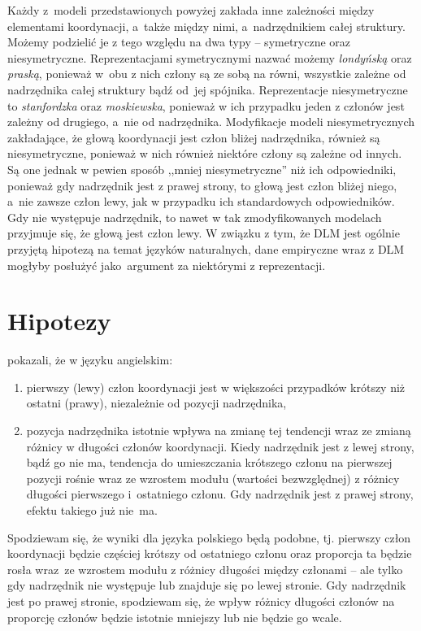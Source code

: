 \documentclass[licencjacka]{pracamgr_Kogni}
\begin{document}
    Każdy z~modeli przedstawionych powyżej zakłada inne zależności między elementami koordynacji, a~także między nimi, a~nadrzędnikiem całej struktury.
    Możemy podzielić je z tego względu na dwa typy -- symetryczne oraz niesymetryczne.
    Reprezentacjami symetrycznymi nazwać możemy \textit{londyńską} oraz \textit{praską}, ponieważ w~obu z nich człony są ze sobą na równi, wszystkie zależne od nadrzędnika całej struktury bądź od~jej spójnika.
    Reprezentacje niesymetryczne to \textit{stanfordzka} oraz \textit{moskiewska}, ponieważ w ich przypadku jeden z członów jest zależny od drugiego, a~nie od nadrzędnika.
    Modyfikacje modeli niesymetrycznych zakładające, że głową koordynacji jest człon bliżej nadrzędnika, również są niesymetryczne, ponieważ w nich również niektóre człony są zależne od innych. 
    Są one jednak w pewien sposób ,,mniej  niesymetryczne'' niż ich odpowiedniki, ponieważ gdy nadrzędnik jest z prawej strony, to głową jest człon bliżej niego, a~nie zawsze człon lewy, jak w przypadku ich standardowych odpowiedników.
    Gdy nie występuje nadrzędnik, to nawet w tak zmodyfikowanych modelach przyjmuje się, że głową jest człon lewy.
    W związku z tym, że DLM jest ogólnie przyjętą hipotezą na temat języków naturalnych, dane empiryczne wraz z DLM mogłyby posłużyć jako~argument za niektórymi z reprezentacji.

    \section{Hipotezy}\label{sec:hipotezy}
    \citet{Przepiorkowski2023} pokazali, że w języku angielskim:
    \begin{enumerate}[label=\arabic*)]
        \item pierwszy (lewy) człon koordynacji jest w większości przypadków krótszy niż ostatni (prawy), niezależnie od pozycji nadrzędnika,
        \item pozycja nadrzędnika istotnie wpływa na zmianę tej tendencji wraz ze zmianą różnicy w długości członów koordynacji. Kiedy nadrzędnik jest z lewej strony, bądź go nie ma, tendencja do umieszczania krótszego członu na pierwszej pozycji rośnie wraz ze wzrostem modułu (wartości bezwzględnej) z różnicy długości pierwszego i~ostatniego członu. Gdy nadrzędnik jest z prawej strony, efektu takiego już nie~ma.
    \end{enumerate}

    Spodziewam się, że wyniki dla języka polskiego będą podobne, tj. pierwszy człon koordynacji będzie częściej krótszy od ostatniego członu oraz proporcja ta będzie rosła wraz~ze wzrostem modułu z różnicy długości między członami -- ale tylko gdy nadrzędnik nie występuje lub znajduje się po lewej stronie. Gdy nadrzędnik jest po prawej stronie, spodziewam się, że wpływ różnicy długości członów na proporcję członów będzie istotnie mniejszy lub nie będzie go wcale.
\end{document}
